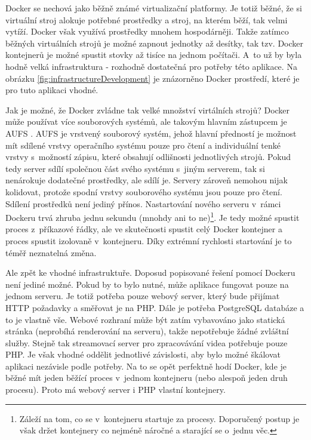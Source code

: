 Docker se nechová jako běžně známé virtualizační platformy. Je totiž běžné, že si virtuální stroj alokuje potřebné prostředky a stroj, na kterém běží, tak velmi vytíží. Docker však využívá prostředky mnohem hospodárněji. Takže zatímco běžných virtuálních strojů je možné zapnout jednotky až desítky, tak tzv. Docker kontejnerů je možné spustit stovky až tisíce na jednom počítači. A~to už by byla hodně velká infrastruktura - rozhodně dostatečná pro potřeby této aplikace. Na obrázku \ref{fig:infrastructureDevelopment} je znázorněno Docker prostředí, které je pro tuto aplikaci vhodné.

Jak je možné, že Docker zvládne tak velké množství virtálních strojů? Docker může používat více souborových systémů, ale takovým hlavním zá\-stup\-cem je AUFS \cite{aufs}. AUFS je vrstvený souborový systém, jehož hlavní předností je možnost mít sdílené vrstvy operačního systému pouze pro čtení a individuální tenké vrstvy s~možností zápisu, které obsahují odlišnosti jednotlivých strojů. Pokud tedy server sdílí společnou část svého systému s~jiným serverem, tak si nenárokuje dodatečné prostředky, ale sdílí je. Servery zároveň nemohou nijak kolidovat, protože spodní vrstvy souborového systému jsou pouze pro čtení. Sdílení prostředků není jediný přínos. Nastartování nového serveru v~rámci Dockeru trvá zhruba jednu sekundu (mnohdy ani to ne)\footnote{Záleží na tom, co se v~kontejneru startuje za procesy. Doporučený postup je však držet kontejnery co nejméně náročné a starající se o~jednu věc.}. Je tedy možné spustit proces z~příkazové řádky, ale ve skutečnosti spustit celý Docker kontejner a proces spustit izolovaně v~kontejneru. Díky extrémní rychlosti startování je to téměř neznatelná změna.

Ale zpět ke vhodné infrastruktuře. Doposud popisované řešení pomocí Dockeru není jediné možné. Pokud by to bylo nutné, může aplikace fungovat pouze na jednom serveru. Je totiž potřeba pouze webový server, který bude přijímat HTTP požadavky a směřovat je na PHP. Dále je potřeba PostgreSQL databáze a to je vlastně vše. Webové rozhraní může být zatím vybavováno jako statická stránka (neprobíhá renderování na serveru), takže nepotřebuje žádné zvláštní služby. Stejně tak streamovací server pro zpracovávání videa potřebuje pouze PHP. Je však vhodné oddělit jednotlivé závislosti, aby bylo možné škálovat aplikaci nezávisle podle potřeby. Na to se opět perfektně hodí Docker, kde je běžné mít jeden běžící proces v~jednom kontejneru (nebo alespoň jeden druh procesu). Proto má webový server i PHP vlastní kontejnery.

